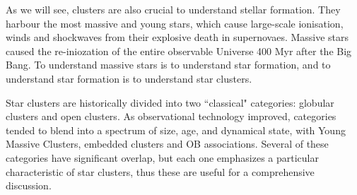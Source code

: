 


As we will see, clusters are also crucial to understand stellar formation. They harbour the most massive and young stars, which cause large-scale ionisation, winds and shockwaves from their explosive death in supernovaes. Massive stars caused the re-iniozation of the entire observable Universe 400 Myr after the Big Bang. To understand massive stars is to understand star formation, and to understand star formation is to understand star clusters.



%
%


Star clusters are historically divided into two ``classical" categories: globular clusters and open clusters. As observational technology improved, categories tended to blend into a spectrum of size, age, and dynamical state, with Young Massive Clusters, embedded clusters and OB associations. Several of these categories have significant overlap, but each one emphasizes a particular characteristic of star clusters, thus these are useful for a comprehensive discussion.


